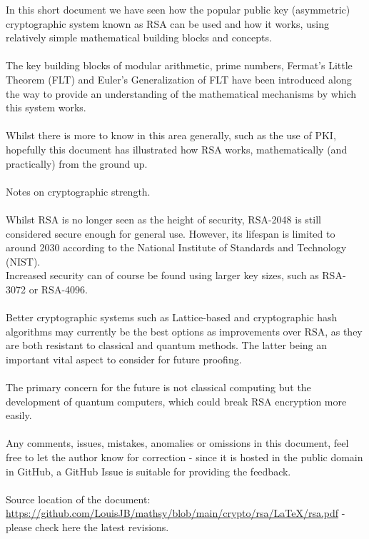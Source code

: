 \documentclass[11pt]{article}   	%
\begin{document}
In this short document we have seen how the popular public key (asymmetric) cryptographic system known as RSA can be used and how it works, using relatively simple mathematical building blocks and concepts. \\
\\
The key building blocks of modular arithmetic, prime numbers, Fermat's Little Theorem (FLT) and Euler's Generalization of FLT have been introduced along the way to provide an understanding of the mathematical mechanisms by which this system works. \\
\\
Whilst there is more to know in this area generally, such as the use of PKI, hopefully this document has illustrated how RSA works, mathematically (and practically) from the ground up. \\
\\
Notes on cryptographic strength. \\
\\
Whilst RSA is no longer seen as the height of security, RSA-2048 is still considered secure enough for general use. However, its lifespan is limited to around 2030 according to the National Institute of Standards and Technology (NIST). \\
Increased security can of course be found using larger key sizes, such as RSA-3072 or RSA-4096. \\
\\
Better cryptographic systems such as Lattice-based and cryptographic hash algorithms may currently be the best options as improvements over RSA, as they are both resistant to classical and quantum methods. The latter being an important vital aspect to consider for future proofing. \\
\\
The primary concern for the future is not classical computing but the development of quantum computers, which could break RSA encryption more easily. \\
\\
Any comments, issues, mistakes, anomalies or omissions in this document, feel free to let the author know for correction - since it is hosted in the public domain in GitHub, a GitHub Issue is suitable for providing the feedback. \\
\\
Source location of the document: \url{https://github.com/LouisJB/mathsy/blob/main/crypto/rsa/LaTeX/rsa.pdf} - please check here the latest revisions.

\break
\end{document}
